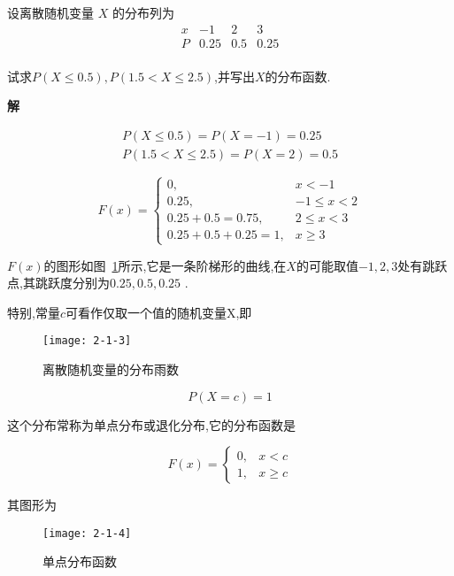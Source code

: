 \begin{example}
	设离散随机变量 $X$ 的分布列为
	\[ 
	\begin{array}{c|ccc}
	x & -1 & 2 & 3 \\\hline
	P & 0.25 & 0.5 & 0.25 \\
	\end{array}
	\]
	
	试求$P(X \leqslant 0.5), P(1.5<X \leqslant 2.5)$,并写出$ X $的分布函数.
	
	\textbf{解}
	
	\[ 
	\begin{array}{l}{P(X \leqslant 0.5)=P(X=-1)=0.25} \\ {P(1.5<X \leqslant 2.5)=P(X=2)=0.5}\end{array}
	\]
	
	\[ 
	F(x)=\left\{\begin{array}{ll}
	{0,} & {x<-1} \\ 
	{0.25,} & {-1 \leqslant x<2} \\ 
	{0.25+0.5=0.75,} & {2 \leqslant x<3} \\ 
	{0.25+0.5+0.25=1,} & {x \geqslant 3}
	\end{array}\right.\]
	
	$ F(x) $的图形如图~\ref{fig:2-1-3}所示,它是一条阶梯形的曲线,在$ X $的可能取值$-1,2,3$处有跳跃点,其跳跃度分别为$ 0.25,0.5,0.25 $ .
	
	
	特别,常量$ c $可看作仅取一个值的随机变量X,即
	
	\begin{figure}
		\centering
		\texttt{[image: 2-1-3]}
		\caption{离散随机变量的分布雨数}
		\label{fig:2-1-3}
	\end{figure}
	
	\[ 
	P(X=c)=1
	\]
	
	这个分布常称为单点分布或退化分布,它的分布函数是
	
	\begin{equation}
	F(x)=\left\{\begin{array}{ll}
	{0,} & {x<c} \\ 
	{1,} & {x \geqslant c}
	\end{array}\right.  \label{eq:2.1.3}
	\end{equation}
	
	其图形为
	\begin{figure}
		\centering
		\texttt{[image: 2-1-4]}
		\caption{单点分布函数}
		\label{fig:2-1-4}
	\end{figure}

\end{example}

